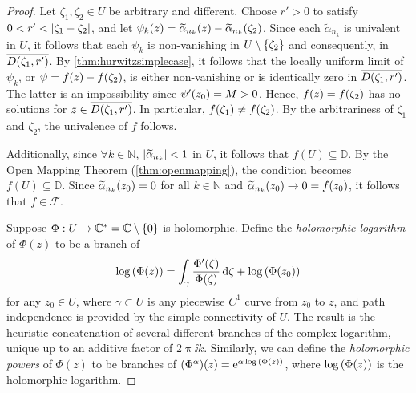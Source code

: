 \begin{proof}
    Let \(\zeta_1,\zeta_2\in U\) be arbitrary and different. Choose \(r'>0\) to satisfy \(0<r'<\abs{\zeta_1-\zeta_2}\), and let \(\psi_k(z)=\widetilde{\alpha}_{n_k}(z)-\widetilde{\alpha}_{n_k}\qty(\zeta_2)\). Since each \(\widetilde{\alpha}_{n_k}\) is univalent in \(U\), it follows that each \(\psi_k\) is non-vanishing in \(U\setminus\cbraces{\zeta_2}\) and consequently, in \(\overline{D\qty(\zeta_1,r')}\). By \cref{thm:hurwitzsimplecase}, it follows that the locally uniform limit of \(\psi_k\), or \(\psi=f(z)-f\qty(\zeta_2)\), is either non-vanishing or is identically zero in \(\overline{D\qty(\zeta_1,r')}\). The latter is an impossibility since \(\psi'\qty(z_0)=M>0\). Hence, \(f(z)=f\qty(\zeta_2)\) has no solutions for \(z\in\overline{D\qty(\zeta_1,r')}\). In particular, \(f\qty(\zeta_1)\neq f\qty(\zeta_2)\). By the arbitrariness of \(\zeta_1\) and \(\zeta_2\), the univalence of \(f\) follows.

    Additionally, since \(\forall k\in\mathbb{N}\), \(\abs{\widetilde{\alpha}_{n_k}}<1\) in \(U\), it follows that \(f(U)\subseteq\overline{\mathbb{D}}\). By the Open Mapping Theorem (\cref{thm:openmapping}), the condition becomes \(f(U)\subseteq\mathbb{D}\). Since \(\widetilde{\alpha}_{n_k}\qty(z_0)=0\) for all \(k\in\mathbb{N}\) and \(\widetilde{\alpha}_{n_k}\qty(z_0)\to 0=f\qty(z_0)\), it follows that \(f\in\mathcal{F}\).

    Suppose \(\Phi:U\to\mathbb{C}^*=\mathbb{C}\setminus\cbraces{0}\) is holomorphic. Define the \textit{holomorphic logarithm} of \(\Phi(z)\) to be a branch of \[\log\qty(\Phi(z))=\int_{\gamma}\frac{\Phi'(\zeta)}{\Phi(\zeta)}\dd{\zeta}+\log\qty(\Phi\qty(z_0))\] for any \(z_0\in U\), where \(\gamma\subset U\) is any piecewise \(C^1\) curve from \(z_0\) to \(z\), and path independence is provided by the simple connectivity of \(U\). The result is the heuristic concatenation of several different branches of the complex logarithm, unique up to an additive factor of \(2\uppi\ii k\). Similarly, we can define the \textit{holomorphic powers} of \(\Phi(z)\) to be branches of \(\qty(\Phi^\alpha)(z)=\mathrm{e}^{\alpha\log\qty(\Phi(z))}\), where \(\log\qty(\Phi(z))\) is the holomorphic logarithm.


\end{proof}
